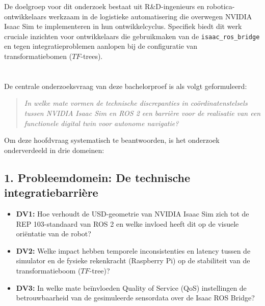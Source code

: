 De doelgroep voor dit onderzoek bestaat uit R\&D-ingenieurs en robotica-ontwikkelaars werkzaam in de logistieke automatisering die overwegen NVIDIA Isaac Sim te implementeren in hun ontwikkelcyclus. Specifiek biedt dit werk cruciale inzichten voor ontwikkelaars die gebruikmaken van de \texttt{isaac\_ros\_bridge} en tegen integratieproblemen aanlopen bij de configuratie van transformatiebomen ($TF$-trees).

\section{}%
\label{sec:onderzoeksvraag}

De centrale onderzoeksvraag van deze bachelorproef is als volgt geformuleerd:

\begin{quote}
    \textit{In welke mate vormen de technische discrepanties in coördinatenstelsels tussen NVIDIA Isaac Sim en ROS 2 een barrière voor de realisatie van een functionele digital twin voor autonome navigatie?}
\end{quote}

Om deze hoofdvraag systematisch te beantwoorden, is het onderzoek onderverdeeld in drie domeinen:

\subsection*{1. Probleemdomein: De technische integratiebarrière}
\begin{itemize}
    \item \textbf{DV1:} Hoe verhoudt de USD-geometrie van NVIDIA Isaac Sim zich tot de REP 103-standaard van ROS 2 en welke invloed heeft dit op de visuele oriëntatie van de robot?
    \item \textbf{DV2:} Welke impact hebben temporele inconsistenties en latency tussen de simulator en de fysieke rekenkracht (Raspberry Pi) op de stabiliteit van de transformatieboom ($TF$-tree)?
    \item \textbf{DV3:} In welke mate beïnvloeden Quality of Service (QoS) instellingen de betrouwbaarheid van de gesimuleerde sensordata over de Isaac ROS Bridge?
\end{itemize}

